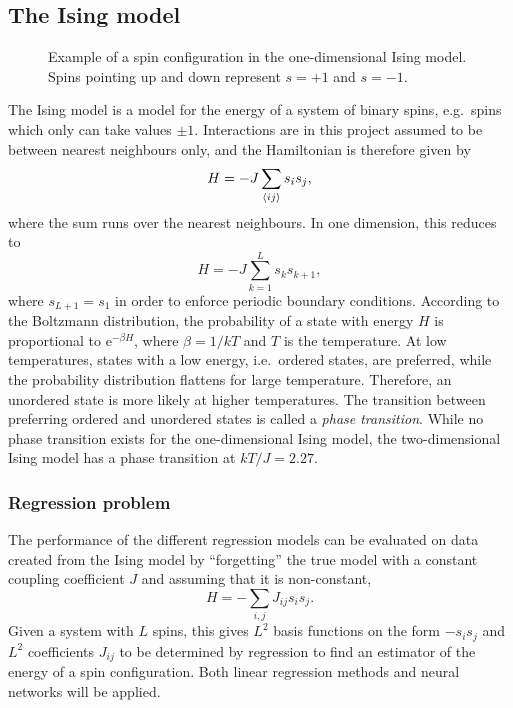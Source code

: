 \documentclass[11pt,british,a4paper]{article}
\renewcommand{\exp}[1]{\mathrm{e}^{#1}}
\numberwithin{equation}{section}
\begin{document}
\subsection{The Ising model}
\begin{figure}[H]
    \centering
    \caption{Example of a spin configuration in the one-dimensional Ising model. Spins pointing up and down represent \(s=+1\) and \(s=-1\).}
\end{figure}
The Ising model is a model for the energy of a system of binary spins, e.g.\ spins which only can take values \(\pm 1\).
Interactions are in this project assumed to be between nearest neighbours only, and the Hamiltonian is therefore given by
\begin{equation}
    H = -J\sum_{\ev{ij}} s_i s_j,
\end{equation}
where the sum runs over the nearest neighbours.
In one dimension, this reduces to
\begin{equation}
    H = - J\sum_{k=1}^{L} s_k s_{k+1},
\end{equation}
where \(s_{L+1}=s_1\) in order to enforce periodic boundary conditions.
According to the Boltzmann distribution, the probability of a state with energy \(H\) is proportional to \(\exp{-\beta H}\), where \(\beta=1/kT\) and \(T\) is the temperature.
At low temperatures, states with a low energy, i.e.\ ordered states, are preferred, while the probability distribution flattens for large temperature. Therefore, an unordered state is more likely at higher temperatures. The transition between preferring ordered and unordered states is called a \emph{phase transition}. While no phase transition exists for the one-dimensional Ising model, the two-dimensional Ising model has a phase transition at \(kT/J=\num{2.27}\).

\subsubsection{Regression problem}
The performance of the different regression models can be evaluated on data created from the Ising model by ``forgetting'' the true model with a constant coupling coefficient \(J\) and assuming that it is non-constant,
\begin{equation}
    H = -\sum_{i, j}J_{ij} s_i s_j.
\end{equation}
Given a system with \(L\) spins, this gives \(L^2\) basis functions on the form \(-s_i s_j\) and \(L^2\) coefficients \(J_{ij}\) to be determined by regression to find an estimator of the energy of a spin configuration. Both linear regression methods and neural networks will be applied.
\end{document}
